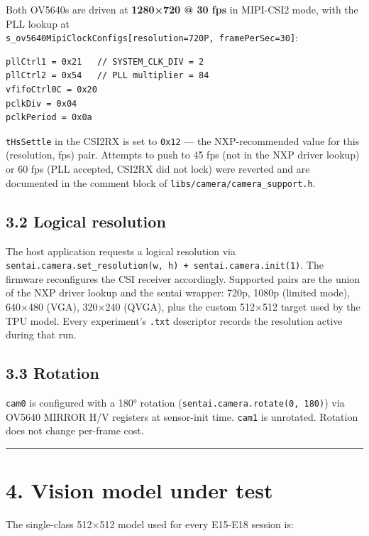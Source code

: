 Both OV5640s are driven at \textbf{1280×720 @ 30 fps} in MIPI-CSI2 mode,
with the PLL lookup at
\texttt{s\_ov5640MipiClockConfigs{[}resolution=720P,\ framePerSec=30{]}}:

\begin{verbatim}
pllCtrl1 = 0x21   // SYSTEM_CLK_DIV = 2
pllCtrl2 = 0x54   // PLL multiplier = 84
vfifoCtrl0C = 0x20
pclkDiv = 0x04
pclkPeriod = 0x0a
\end{verbatim}

\texttt{tHsSettle} in the CSI2RX is set to \texttt{0x12} --- the
NXP-recommended value for this (resolution, fps) pair. Attempts to push
to 45 fps (not in the NXP driver lookup) or 60 fps (PLL accepted, CSI2RX
did not lock) were reverted and are documented in the comment block of
\texttt{libs/camera/camera\_support.h}.

\subsection{3.2 Logical resolution}\label{logical-resolution}

The host application requests a logical resolution via
\texttt{sentai.camera.set\_resolution(w,\ h)\ +\ sentai.camera.init(1)}.
The firmware reconfigures the CSI receiver accordingly. Supported pairs
are the union of the NXP driver lookup and the sentai wrapper: 720p,
1080p (limited mode), 640×480 (VGA), 320×240 (QVGA), plus the custom
512×512 target used by the TPU model. Every experiment's \texttt{.txt}
descriptor records the resolution active during that run.

\subsection{3.3 Rotation}\label{rotation}

\texttt{cam0} is configured with a 180° rotation
(\texttt{sentai.camera.rotate(0,\ 180)}) via OV5640 MIRROR H/V registers
at sensor-init time. \texttt{cam1} is unrotated. Rotation does not
change per-frame cost.

\begin{center}\rule{0.5\linewidth}{0.5pt}\end{center}

\section{4. Vision model under test}\label{vision-model-under-test}

The single-class 512×512 model used for every E15-E18 session is:

